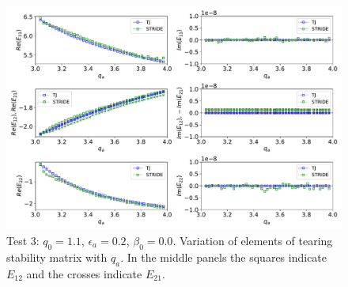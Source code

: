 \documentclass[12pt,prb,aps,notitlepage]{revtex4-1}
\begin{document}
\newpage
\begin{figure}
\centerline{\includegraphics[width=\textwidth]{Test3.pdf}}
\caption{Test 3: $q_0=1.1$, $\epsilon_a=0.2$, $\beta_0=0.0$. Variation of elements of tearing stability matrix with $q_a$. In the middle panels the squares
indicate  $E_{12}$ and the crosses indicate $E_{21}$. }
\end{figure}
\end{document}
